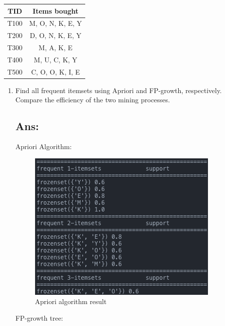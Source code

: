 \begin{center}
\begin{tabular}{ |c|c| } 
	\hline
	TID & Items bought \\
	\hline
		T100 & M, O, N, K, E, Y \\
		T200 & D, O, N, K, E, Y \\
		T300 & M, A, K, E \\
		T400 & M, U, C, K, Y \\
		T500 & C, O, O, K, I, E \\
	\hline
\end{tabular}
\end{center}

\begin{enumerate}[label=(\alph*)]

	\item Find all frequent itemsets using Apriori and FP-growth, respectively.
	Compare the efficiency of the two mining processes.
	\subsection*{Ans:}
	Apriori Algorithm:
	\begin{figure}[h!]
		\centering
		\includegraphics[width=\textwidth]{../output/apriori}
		\caption{Apriori algorithm result}
		\label{fig:empirical-distribution}
	\end{figure}

\clearpage

	FP-growth tree:


\end{enumerate}
